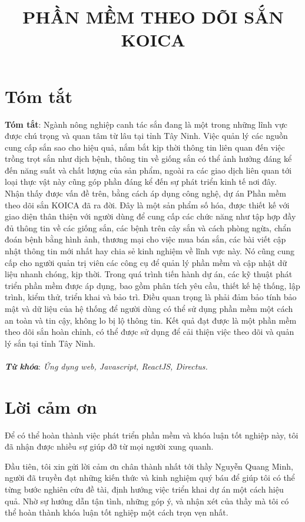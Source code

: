 \documentclass[12pt]{extreport}
\title{PHẦN MỀM THEO DÕI SẮN KOICA}
\begin{document}
\renewcommand*\listfigurename{Danh sách hình ảnh}


\clearpage{}

\chapter*{\centering Tóm tắt}
\textbf{Tóm tắt}: Ngành nông nghiệp canh tác sắn đang là một trong những lĩnh vực được chú trọng và quan tâm từ lâu tại tỉnh Tây Ninh. Việc quản lý các nguồn cung cấp sắn sao cho hiệu quả, nắm bắt kịp thời thông tin liên quan đến việc trồng trọt sắn như dịch bệnh, thông tin về giống sắn có thể ảnh hưởng đáng kể đến năng suất và chất lượng của sản phẩm, ngoài ra các giao dịch liên quan tới loại thực vật này cũng góp phần đáng kể đến sự phát triển kinh tế nơi đây.\\ Nhận thấy được vấn đề trên, bằng cách áp dụng công nghệ, dự án Phần mềm theo dõi sắn KOICA đã ra đời. Đây là một sản phẩm số hóa, được thiết kế với giao diện thân thiện với người dùng để cung cấp các chức năng như tập hợp đầy đủ thông tin về các giống sắn, các bệnh trên cây sắn và cách phòng ngừa, chẩn đoán bệnh bằng hình ảnh, thương mại cho việc mua bán sắn, các bài viết cập nhật thông tin mới nhất hay chia sẻ kinh nghiệm về lĩnh vực này. Nó cũng cung cấp cho người quản trị viên các công cụ để quản lý phần mềm và cập nhật dữ liệu nhanh chóng, kịp thời. Trong quá trình tiến hành dự án, các kỹ thuật phát triển phần mềm được áp dụng, bao gồm phân tích yêu cầu, thiết kế hệ thống, lập trình, kiểm thử, triển khai và bảo trì. Điều quan trọng là phải đảm bảo tính bảo mật và dữ liệu của hệ thống để người dùng có thể sử dụng phần mềm một cách an toàn và tin cậy, không lo bị lộ thông tin. Kết quả đạt được là một phần mềm theo dõi sắn hoàn chỉnh, có thể được sử dụng để cải thiện việc theo dõi và quản lý sắn tại tỉnh Tây Ninh.\\ \\
\textbf{\textit{Từ khóa}}: \textit{Ứng dụng web, Javascript, ReactJS, Directus.}


\chapter*{Lời cảm ơn}
Để có thể hoàn thành việc phát triển phần mềm và khóa luận tốt nghiệp này, tôi đã nhận được nhiều sự giúp đỡ từ mọi người xung quanh.

Đầu tiên, tôi xin gửi lời cảm ơn chân thành nhất tới thầy Nguyễn Quang Minh, người đã truyền đạt những kiến thức và kinh nghiệm quý báu để giúp tôi có thể từng bước nghiên cứu đề tài, định hướng việc triển khai dự án một cách hiệu quả. Nhờ sự hướng dẫn tận tình, những góp ý, và nhận xét của thầy mà tôi có thể hoàn thành khóa luận tốt nghiệp một cách trọn vẹn nhất.
\end{document}
